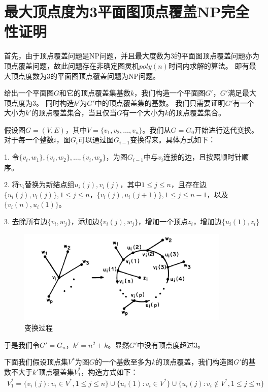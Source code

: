 \documentclass[UTF8]{ctexart}
\begin{document}
\section{最大顶点度为3平面图顶点覆盖NP完全性证明}
首先，由于顶点覆盖问题是NP问题，并且最大度数为3的平面图顶点覆盖问题亦为顶点覆盖问题，故此问题存在非确定图灵机$poly(n)$时间内求解的算法。
即有最大顶点度数为3的平面图顶点覆盖问题为NP问题。 \par
给出一个平面图$G$和它的顶点覆盖集基数$k$，我们构造一个平面图$G'$，$G'$满足最大顶点度为3。
同时构造$k'$为$G'$中的顶点覆盖集的基数。
我们只需要证明$G'$有一个大小为$k'$的顶点覆盖集合，当且仅当$G$有一个大小为$k$的顶点覆盖集合。\par
假设图$G=(V,E)$，其中$V=\{v_1,v_2,\dots,v_n\}$。我们从$G=G_0$开始进行迭代变换。
对于每一个整数$i$，图$G_i$可以通过图$G_{i-1}$变换得来。具体方式如下： \par
1. 令$\{v_i,w_1\},\{v_i,w_2\},\dots,\{v_i,w_p\}$，为图$G_{i-1}$中与$v_i$连接的边，且按照顺时针顺序。 \par
2. 将$v_i$替换为新结点组$u_i(j),v_i(j)$，其中$1 \leq j \leq n$，且存在边$\{u_i(j),v_i(j)\}, 1 \leq j \leq n$，$\{v_i(j),u_i(j+1)\}, 1 \leq j \leq n-1$，以及$\{v_i(n),u_i(1)\}$。 \par
3. 去除所有边$\{v_i, w_j\}$，添加边$\{v_i(j), w_j\}$，增加一个顶点$z_i$，增加边$\{u_i(1),z_i\}$ \par
\begin{figure}[htbp]
    \centering %
    \includegraphics[height=4.5cm]{graph3.png}
    \caption{变换过程}
\end{figure}
\noindent 于是我们令$G'=G_n$，$k' = n^2 + k$。显然$G'$中没有顶点度超过3。 \par
下面我们假设顶点集$V^*$为图$G$的一个基数至多为$k$的顶点覆盖，我们构造图$G'$的基数不大于$k'$顶点覆盖集$V_1^*$，构造方式如下：
\begin{gather*}
    V_1^* = \{v_i(j): v_i \in V^*, 1 \leq j \leq n\} \cup \{u_i(1): v_i \in V^*\} \cup \{u_i(j):v_i \notin V^*, 1 \leq j \leq n \}
\end{gather*}
\end{document}
